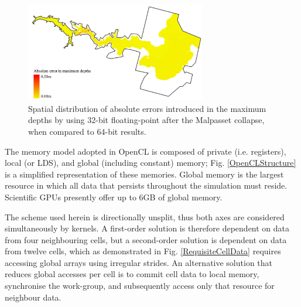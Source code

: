 \documentclass[11pt,english,a4paper]{article}
\begin{document}
\begin{figure}[tbh]
\centering
\includegraphics[width=0.7\textwidth]{Figure_12_Colour.jpg}
\caption{Spatial distribution of absolute errors introduced in the maximum depths by using 32-bit floating-point after the Malpasset collapse, when compared to 64-bit results.}
\label{FPErrorMax}
\end{figure}

The memory model adopted in OpenCL is composed of private (i.e. registers), local (or LDS), and global (including constant) memory; Fig. \ref{OpenCLStructure} is a simplified representation of these memories. Global memory is the largest resource in which all data that persists throughout the simulation must reside. Scientific GPUs presently offer up to 6GB of global memory.

The scheme used herein is directionally unsplit, thus both axes are considered simultaneously by kernels. A first-order solution is therefore dependent on data from four neighbouring cells, but a second-order solution is dependent on data from twelve cells, which as demonstrated in Fig. \ref{RequisiteCellData} requires accessing global arrays using irregular strides. An alternative solution that reduces global accesses per cell is to commit cell data to local memory, synchronise the work-group, and subsequently access only that resource for neighbour data. 
\end{document}
